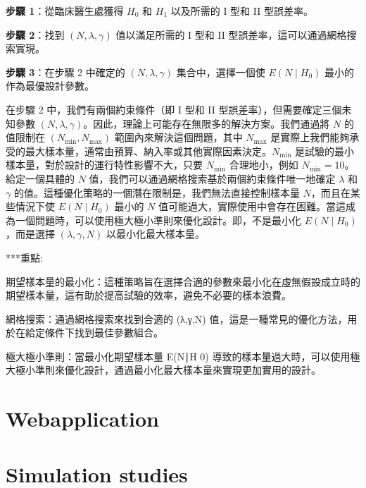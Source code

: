\textbf{步驟 1}：從臨床醫生處獲得 \( H_0 \) 和 \( H_1 \) 以及所需的 I 型和 II 型誤差率。

\textbf{步驟 2}：找到 \( (N, \lambda, \gamma) \) 值以滿足所需的 I 型和 II 型誤差率，這可以通過網格搜索實現。

\textbf{步驟 3}：在步驟 2 中確定的 \( (N, \lambda, \gamma) \) 集合中，選擇一個使 \( E(N \mid H_0) \) 最小的作為最優設計參數。

在步驟 2 中，我們有兩個約束條件（即 I 型和 II 型誤差率），但需要確定三個未知參數 \( (N, \lambda, \gamma) \)。因此，理論上可能存在無限多的解決方案。我們通過將 \( N \) 的值限制在 \( (N_{\text{min}}, N_{\text{max}}) \) 範圍內來解決這個問題，其中 \( N_{\text{max}} \) 是實際上我們能夠承受的最大樣本量，通常由預算、納入率或其他實際因素決定。\( N_{\text{min}} \) 是試驗的最小樣本量，對於設計的運行特性影響不大，只要 \( N_{\text{min}} \) 合理地小，例如 \( N_{\text{min}} = 10 \)。給定一個具體的 \( N \) 值，我們可以通過網格搜索基於兩個約束條件唯一地確定 \( \lambda \) 和 \( \gamma \) 的值。這種優化策略的一個潛在限制是，我們無法直接控制樣本量 \( N \)，而且在某些情況下使 \( E(N \mid H_0) \) 最小的 \( N \) 值可能過大，實際使用中會存在困難。當這成為一個問題時，可以使用極大極小準則來優化設計。即，不是最小化 \( E(N \mid H_0) \)，而是選擇 \( (\lambda, \gamma, N) \) 以最小化最大樣本量。


***重點:

期望樣本量的最小化：這種策略旨在選擇合適的參數來最小化在虛無假設成立時的期望樣本量，這有助於提高試驗的效率，避免不必要的樣本浪費。

網格搜索：通過網格搜索來找到合適的 (λ,γ,N) 值，這是一種常見的優化方法，用於在給定條件下找到最佳參數組合。

極大極小準則：當最小化期望樣本量 E(N∣H 0) 導致的樣本量過大時，可以使用極大極小準則來優化設計，通過最小化最大樣本量來實現更加實用的設計。

\section{Webapplication}
\section{Simulation studies}




